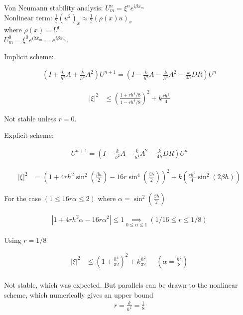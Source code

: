 \newpage

\LARGE
Von Neumann stability analysis: $U_m^n = \xi^n e^{i \beta x_m}$ \\
\Large
Nonlinear term: $\frac{1}{2}(u^2)_x \approx \frac{1}{2}(\rho(x)u)_x$ \\
where $\rho(x) = U^0$ \\

$U_{m}^0 = \xi^0 e^{i\beta x_m} = e^{i\beta x_m}$.

\huge
Implicit scheme:

\Large
\begin{align*}
\left( I + \frac{k}{h^2}A + \frac{k}{h^4}A^2\right) U^{n+1} = \left( I - \frac{k}{h^2}A - \frac{k}{h^4}A^2 - \frac{k}{4h} DR \right)U^{n}
\end{align*}


\begin{align*}
|\xi |^2 &\le \left(\frac{1+rh^4/8}{1-rh^4/8}\right)^2 + k\frac{rh^2}{4}
\end{align*}

Not stable unless $r=0$.


\huge

Explicit scheme:

\Large
\begin{align*}
U^{n+1} = \left(I - \frac{k}{h^2}A - \frac{k}{h^4}A^2 - \frac{k}{4h} DR\right)U^{n} 
\end{align*}




\begin{align*}
|\xi |^2 &=  \left(1+4rh^2\sin^2\left(\frac{\beta h}{2}\right)-16r\sin^4\left(\frac{\beta h}{2}\right)\right)^2 + k\left(\frac{rh^2}{4}\sin^2(2\beta h)\right)
\end{align*}

For the case $(1 \le 16r\alpha \le 2)$ where $\alpha = \sin^2(\frac{\beta h}{2})$

\begin{align*}
 \left| 1+4rh^2\alpha -16r\alpha^2\right| \le 1 \underset{0\le \alpha\le 1}{\implies} \left(1/16 \le r \le 1/8 \right)
\end{align*} 

Using $r = 1/8$ 

\begin{align*}
|\xi |^2 &\le \left(1 + \frac{h^4}{32}\right)^2 + k\frac{h^2}{32} &\text{ } ( \alpha = \frac{h^2}{8} )\\
\end{align*}

Not stable, which was expected. But parallels can be drawn to the nonlinear scheme, which numerically gives an upper bound\\
\begin{align*}
r = \frac{k}{h^2} = \frac{1}{8}
\end{align*} 



